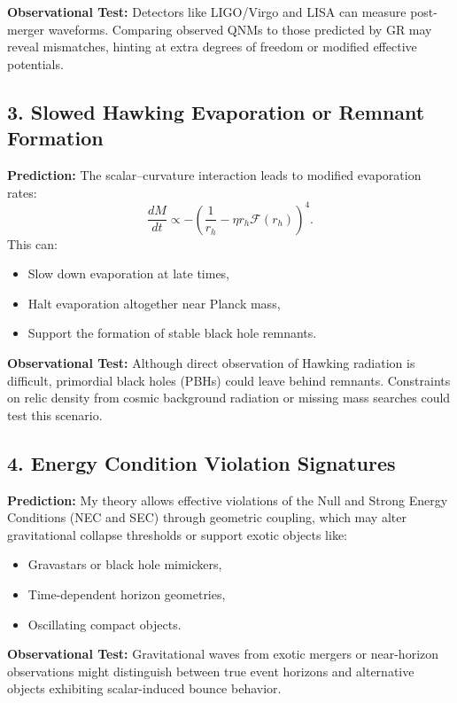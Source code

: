 \documentclass[12pt]{article}
\begin{document}
\textbf{Observational Test:}  
Detectors like LIGO/Virgo and LISA can measure post-merger waveforms. Comparing observed QNMs to those predicted by GR may reveal mismatches, hinting at extra degrees of freedom or modified effective potentials.

\subsection{3. Slowed Hawking Evaporation or Remnant Formation}

\textbf{Prediction:}  
The scalar–curvature interaction leads to modified evaporation rates:
\[
\frac{dM}{dt} \propto -\left( \frac{1}{r_h} - \eta r_h \mathcal{F}(r_h) \right)^4.
\]
This can:
\begin{itemize}
    \item Slow down evaporation at late times,
    \item Halt evaporation altogether near Planck mass,
    \item Support the formation of stable black hole remnants.
\end{itemize}

\textbf{Observational Test:}  
Although direct observation of Hawking radiation is difficult, primordial black holes (PBHs) could leave behind remnants. Constraints on relic density from cosmic background radiation or missing mass searches could test this scenario.

\subsection{4. Energy Condition Violation Signatures}

\textbf{Prediction:}  
My theory allows effective violations of the Null and Strong Energy Conditions (NEC and SEC) through geometric coupling, which may alter gravitational collapse thresholds or support exotic objects like:
\begin{itemize}
    \item Gravastars or black hole mimickers,
    \item Time-dependent horizon geometries,
    \item Oscillating compact objects.
\end{itemize}

\textbf{Observational Test:}  
Gravitational waves from exotic mergers or near-horizon observations might distinguish between true event horizons and alternative objects exhibiting scalar-induced bounce behavior.
\end{document}
